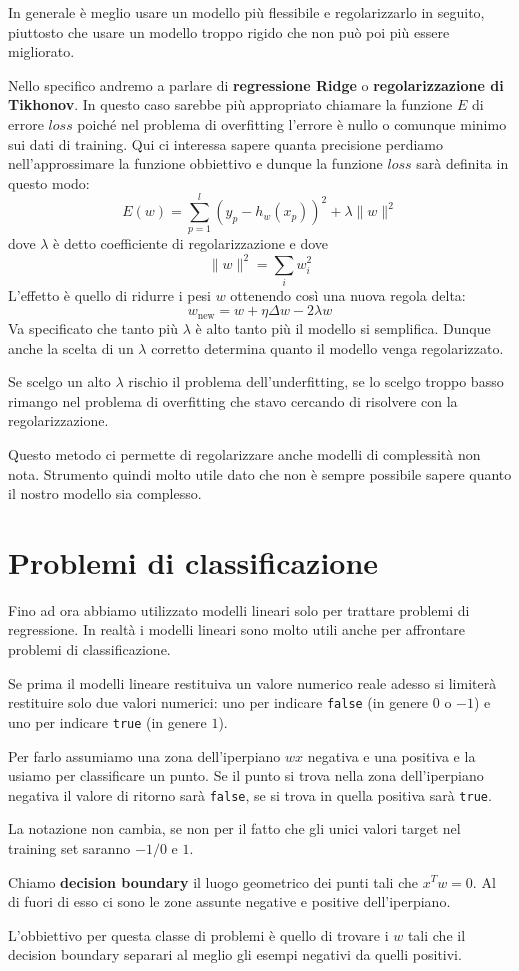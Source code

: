 In generale \`e meglio usare un modello pi\`u flessibile e regolarizzarlo in seguito, piuttosto che usare un modello
troppo rigido che non pu\`o poi pi\`u essere migliorato.

Nello specifico andremo a parlare di \textbf{regressione Ridge} o \textbf{regolarizzazione di Tikhonov}. In questo caso
sarebbe pi\`u appropriato chiamare la funzione $E$ di errore $loss$ poich\'e nel problema di overfitting l'errore \`e
nullo o comunque minimo sui dati di training. Qui ci interessa sapere quanta precisione perdiamo nell'approssimare la
funzione obbiettivo e dunque la funzione $loss$ sar\`a definita in questo modo:
\[ E(w) = \sum_{p = 1}^l (y_p - h_w(x_p))^2 + \lambda \| w \|^2 \]
dove $\lambda$ \`e detto coefficiente di regolarizzazione e dove
\[ \| w \|^2 = \sum_{i} w_i^2 \]
L'effetto \`e quello di ridurre i pesi $w$ ottenendo cos\`i una nuova regola delta:
\[ w_{\text{new}} = w + \eta \Delta w - 2 \lambda w \]
Va specificato che tanto pi\`u $\lambda$ \`e alto tanto pi\`u il modello si semplifica. Dunque anche la scelta di un
$\lambda$ corretto determina quanto il modello venga regolarizzato.

Se scelgo un alto $\lambda$ rischio il problema dell'underfitting, se lo scelgo troppo basso rimango nel problema di
overfitting che stavo cercando di risolvere con la regolarizzazione.

Questo metodo ci permette di regolarizzare anche modelli di complessit\`a non nota. Strumento quindi molto utile dato
che non \`e sempre possibile sapere quanto il nostro modello sia complesso.

\section{Problemi di classificazione}
Fino ad ora abbiamo utilizzato modelli lineari solo per trattare problemi di regressione. In realt\`a i modelli lineari
sono molto utili anche per affrontare problemi di classificazione.

Se prima il modelli lineare restituiva un valore numerico reale adesso si limiter\`a restituire solo due valori numerici:
uno per indicare \verb|false| (in genere $0$ o $-1$) e uno per indicare \verb|true| (in genere $1$).

Per farlo assumiamo una zona dell'iperpiano $wx$ negativa e una positiva e la usiamo per classificare un punto. Se il
punto si trova nella zona dell'iperpiano negativa il valore di ritorno sar\`a \verb|false|, se si trova in quella
positiva sar\`a \verb|true|.

La notazione non cambia, se non per il fatto che gli unici valori target nel training set saranno $-1/0$ e $1$.

\begin{definition}
	Chiamo \textbf{decision boundary} il luogo geometrico dei punti tali che $x^T w = 0$. Al di fuori di esso ci sono
	le zone assunte negative e positive dell'iperpiano.
\end{definition}

L'obbiettivo per questa classe di problemi \`e quello di trovare i $w$ tali che il decision boundary separari al
meglio gli esempi negativi da quelli positivi.
